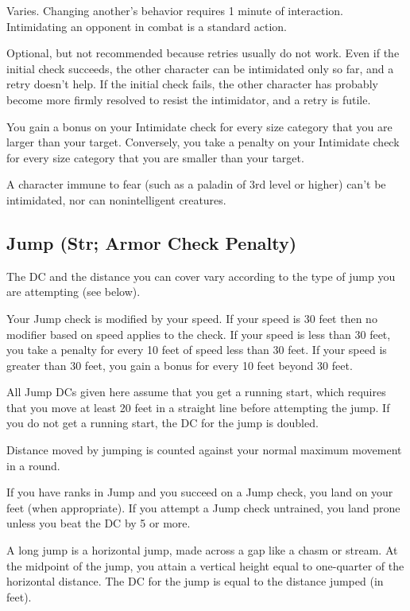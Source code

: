 Varies. Changing another's behavior requires 1 minute of interaction. Intimidating an opponent in combat is a standard action.

 Optional, but not recommended because retries usually do not work. Even if the initial check succeeds, the other character can be intimidated only so far, and a retry doesn't help. If the initial check fails, the other character has probably become more firmly resolved to resist the intimidator, and a retry is futile.

 You gain a  bonus on your Intimidate check for every size category that you are larger than your target. Conversely, you take a  penalty on your Intimidate check for every size category that you are smaller than your target.

\par A character immune to fear (such as a paladin of 3rd level or higher) can't be intimidated, nor can nonintelligent creatures.

\subsection{Jump (Str; Armor Check Penalty)}
 The DC and the distance you can cover vary according to the type of jump you are attempting (see below).

Your Jump check is modified by your speed. If your speed is 30 feet then no modifier based on speed applies to the check. If your speed is less than 30 feet, you take a  penalty for every 10 feet of speed less than 30 feet. If your speed is greater than 30 feet, you gain a  bonus for every 10 feet beyond 30 feet.

All Jump DCs given here assume that you get a running start, which requires that you move at least 20 feet in a straight line before attempting the jump. If you do not get a running start, the DC for the jump is doubled.

Distance moved by jumping is counted against your normal maximum movement in a round.

If you have ranks in Jump and you succeed on a Jump check, you land on your feet (when appropriate). If you attempt a Jump check untrained, you land prone unless you beat the DC by 5 or more.

 A long jump is a horizontal jump, made across a gap like a chasm or stream. At the midpoint of the jump, you attain a vertical height equal to one-quarter of the horizontal distance. The DC for the jump is equal to the distance jumped (in feet).

